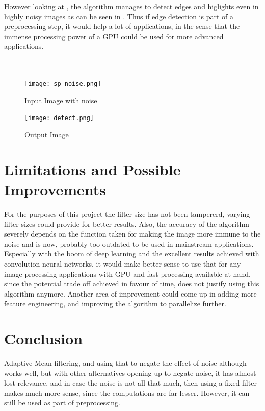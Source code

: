 \documentclass[]{article}
\begin{document}
\vspace{5mm} However looking at  , the algorithm manages to detect edges and higlights even in highly noisy images as can be seen in .  Thus if edge detection is part of a preprocessing step, it would help a lot of applications, in the sense that the immense processing power of a GPU could be used for more advanced applications.\\ \\ \\ 
\begin{figure}[H]
	\texttt{[image: sp\_noise.png]}
	\centering
	\caption{Input Image with noise} 
	\label{fig:inputnoise}
\end{figure}
\begin{figure}[H]
	\centering
	\texttt{[image: detect.png]}
	\caption{Output Image}
	\label{fig:outputnoise}
\end{figure}

\vspace{5mm}
\section*{Limitations and Possible Improvements}
\hspace{4mm} For the purposes of this project the filter size has not been tampererd, varying filter sizes could provide
for better results. Also, the accuracy of the algorithm severely depends on the function taken for making
the image more immune to the noise and is now, probably too outdated to be used in mainstream applications. 
Especially with the boom of deep learning and the excellent results achieved with convolution neural
networks, it would make better sense to use that for any image processing applications with GPU and fast
processing available at hand, since the potential trade off achieved in favour of time, does not justify using
this algorithm anymore. Another area of improvement could come up in adding more feature engineering,
and improving the algorithm to parallelize further.
\section*{Conclusion}
\hspace{4mm} Adaptive Mean filtering, and using that to negate the effect of noise although works well, but with other
alternatives opening up to negate noise, it has almost lost relevance, and in case the noise is not all that
much, then using a fixed filter makes much more sense, since the computations are far lesser. However, it
can still be used as part of preprocessing.

 

\end{document}
